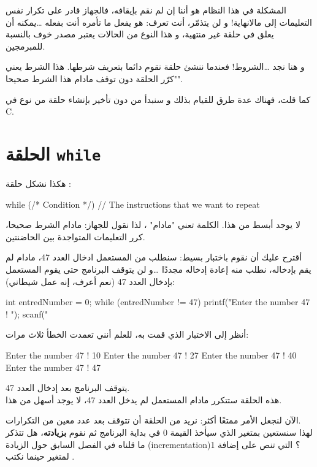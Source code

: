 المشكلة في هذا النظام هو أننا إن لم نقم بإيقافه، فالجهاز قادر على تكرار نفس التعليمات إلى مالانهاية! و لن يتذمّر، أنت تعرف: هو يفعل ما تأمره أنت بفعله \dots يمكنه أن يعلق في حلقة غير منتهية، و هذا النوع من الحالات يعتبر مصدر خوف  بالنسبة للمبرمجين.

و هنا نجد \dots الشروط! فعندما ننشئ حلقة نقوم دائما بتعريف شرطها. هذا الشرط يعني "كرّر الحلقة دون توقف مادام هذا الشرط صحيحا".

كما قلت، فهناك عدة طرق للقيام بذلك و سنبدأ من دون تأخير بإنشاء حلقة من نوع 
في \textenglish{C}.

\section{الحلقة \texttt{while}}

هكذا نشكل حلقة 
:

\begin{Csource}
while (/* Condition */)
{
	// The instructions that we want to repeat
}
\end{Csource}

لا يوجد أبسط من هذا. الكلمة 
تعني "مادام" ، لذا نقول للجهاز: مادام الشرط صحيحا، كرر التعليمات المتواجدة بين الحاضنتين.

أقترح عليك أن نقوم باختبار بسيط: سنطلب من المستعمل ادخال العدد 47، مادام لم يقم بإدخاله، نطلب منه إعادة إدخاله مجددًا \dots و لن يتوقف البرنامج حتى يقوم المستعمل بإدخال العدد 47 (نعم أعرف، إنه عمل شيطاني):

\begin{Csource}
int entredNumber = 0;
while (entredNumber != 47)
{
	printf("Enter the number 47 ! ");
	scanf("%
}
\end{Csource}

أنظر إلى الاختبار الذي قمت به، للعلم أنني تعمدت الخطأ ثلاث مرات:

\begin{Console}
Enter the number 47 ! 10
Enter the number 47 ! 27
Enter the number 47 ! 40
Enter the number 47 ! 47
\end{Console}

يتوقف البرنامج بعد إدخال العدد 47.\\
 هذه الحلقة 
 ستتكرر مادام المستعمل لم يدخل العدد 47، لا يوجد أسهل من هذا.
 
الآن لنجعل الأمر ممتعًا أكثر: نريد من الحلقة أن تتوقف بعد عدد معين من التكرارات.\\
لهذا سنستعين بمتغير
الذي سيأخذ القيمة $ 0 $ في بداية البرنامج ثم نقوم 
\textbf{بزيادته}،
 هل تتذكر ما قلناه في الفصل السابق حول الزيادة 
(\textenglish{incrementation})؟
 التي تنص على إضافة 1 لمتغير حينما نكتب
.

